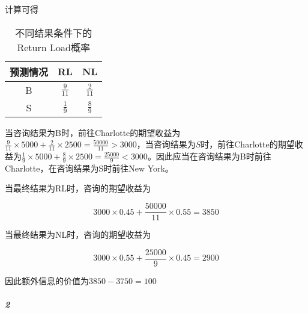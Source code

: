 \documentclass{../notes}
\begin{document}
\begin{subquestions}
        计算可得

        \begin{table}[ht]
            \centering
            \caption{不同结果条件下的Return Load概率}
            \begin{tabular}{ccc}
                \toprule
                预测情况 & RL & NL \\
                \midrule
                B & $\frac{9}{11}$ & $\frac{2}{11}$ \\
                S & $\frac{1}{9}$ & $\frac{8}{9}$ \\
                \bottomrule
            \end{tabular}
        \end{table}

        当咨询结果为B时，前往Charlotte的期望收益为$\frac{9}{11} \times 5000 + \frac{2}{11}\times 2500 = \frac{50000}{11} > 3000$，当咨询结果为$S$时，前往Charlotte的期望收益为$\frac{1}{9} \times 5000 + \frac{8}{9}\times 2500 = \frac{25000}{9} < 3000$。因此应当在咨询结果为B时前往Charlotte，在咨询结果为S时前往New York。

        \item 当最终结果为RL时，咨询的期望收益为

        \begin{equation}
            3000\times 0.45 + \frac{50000}{11} \times 0.55 = 3850
        \end{equation}

        当最终结果为NL时，咨询的期望收益为

        \begin{equation}
            3000\times 0.55 + \frac{25000}{9} \times 0.45 = 2900
        \end{equation}

        因此额外信息的价值为$3850 - 3750 = 100$
    \end{subquestions}

    \subparagraph*{2}
\end{document}
